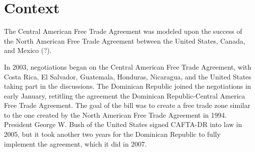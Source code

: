 \documentclass[12pt]{article}
\title{
\textmd{\textbf{\Title}}
\textbf{\author{\AuthorName \\ \Class \date{\today}}}}
\begin{document}
\newcommand{\Title}{Trade Liberalization and the Dominican Republic}
\newcommand{\Class}{Economics 4993}
\newcommand{\AuthorName}{James Sayre}
      
\maketitle
\doublespacing
\setcounter{footnote}{0}
\renewcommand{\thefootnote}{\arabic{footnote}}

\vspace{-25pt}
\begin{abstract}
Over the last several decades, trade barriers have fallen substantially, and agreements promoting
free trade between countries have proliferated. One such agreement, the Central American Free Trade 
Agreement (CAFTA, or CAFTA-DR), aimed to lower trade barriers between Central American countries and 
the United States.
\end{abstract}



\vspace{-10pt}
\section{Context}
\label{sec:Context}
The Central American Free Trade Agreement was modeled upon the success of the
North American Free Trade Agreement between the United States, Canada, and Mexico (?).


In 2003, negotiations began on the Central American Free Trade Agreement, with Costa Rica, El 
Salvador, Guatemala, Honduras, Nicaragua, and the United States taking part in the discussions. The 
Dominican Republic joined the negotiations in early January, retitling the agreement the Dominican 
Republic-Central America Free Trade Agreement. The goal of the bill was to create a free trade zone 
similar to the one created by the North American Free Trade Agreement in 1994. President George W. 
Bush of the United States signed CAFTA-DR into law in 2005, but it took another two years for the 
Dominican Republic to fully implement the agreement, which it did in 2007.
\end{document}
